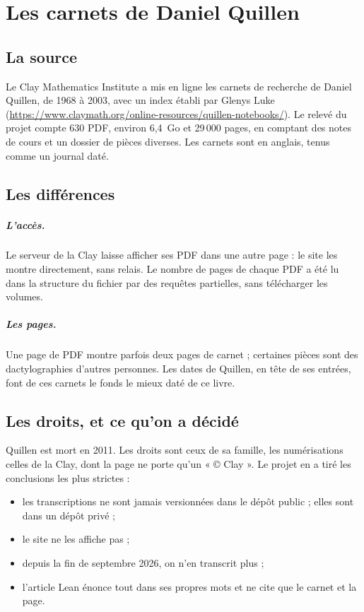 \chapter{Les carnets de Daniel Quillen}\label{ch:quillen}

\section{La source}

Le Clay Mathematics Institute a mis en ligne les carnets de recherche de Daniel Quillen,
de 1968 à 2003, avec un index établi par Glenys Luke
(\url{https://www.claymath.org/online-resources/quillen-notebooks/}). Le relevé du projet
compte 630 PDF, environ 6,4~Go et 29\,000 pages, en comptant des notes de cours et un
dossier de pièces diverses. Les carnets sont en anglais, tenus comme un journal daté.

\section{Les différences}

\paragraph{L'accès.} Le serveur de la Clay laisse afficher ses PDF dans une autre page : le
site les montre directement, sans relais. Le nombre de pages de chaque PDF a été lu dans la
structure du fichier par des requêtes partielles, sans télécharger les volumes.

\paragraph{Les pages.} Une page de PDF montre parfois deux pages de carnet ; certaines pièces
sont des dactylographies d'autres personnes. Les dates de Quillen, en tête de ses entrées,
font de ces carnets le fonds le mieux daté de ce livre.

\section{Les droits, et ce qu'on a décidé}

Quillen est mort en 2011. Les droits sont ceux de sa famille, les numérisations celles de
la Clay, dont la page ne porte qu'un « © Clay ». Le projet en a tiré les conclusions les
plus strictes :
\begin{itemize}
  \item les transcriptions ne sont jamais versionnées dans le dépôt public ; elles sont
        dans un dépôt privé ;
  \item le site ne les affiche pas ;
  \item depuis la fin de septembre 2026, on n'en transcrit plus ;
  \item l'article Lean énonce tout dans ses propres mots et ne cite que le carnet et la
        page.
\end{itemize}

